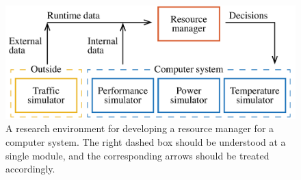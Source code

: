 \begin{figure}[b]
  \centering
  \includegraphics[width=1.0\columnwidth]{include/assets/figures/development.pdf}
  \caption{
    A research environment for developing a resource manager for a computer
    system. The right dashed box should be understood at a single module, and
    the corresponding arrows should be treated accordingly.
  }
\end{figure}
